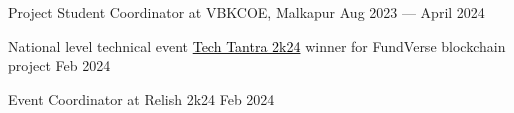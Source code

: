 Project Student Coordinator at VBKCOE, Malkapur \hfill Aug 2023 --- April 2024

National level technical event \href{https://www.linkedin.com/posts/thekiranmahajan_fundverse-fundverse-techtantra2k24-activity-7172095331562577921-4UgM?utm_source=share&utm_medium=member_desktop}{\textcolor{black}{Tech Tantra 2k24}} winner for FundVerse blockchain project \hfill Feb 2024

Event Coordinator at Relish 2k24 \hfill Feb 2024

